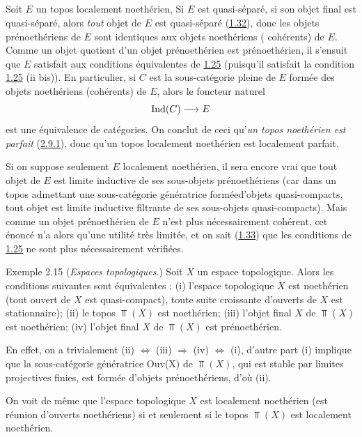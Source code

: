 \documentclass[10pt]{../fichiers-configuration-latex/smfart}
\begin{document}
\subsection{}
Soit $E$ un topos localement noethérien, Si $E$ est quasi-séparé,
\ie si son objet final est quasi-séparé, alors \emph{tout} objet de
$E$ est quasi-séparé (\hyperref[VI.subsec1.32]{1.32}), donc les objets
prénoethériens de $E$ sont identiques aux objets noethériens (\ie
cohérents) de $E$. Comme un objet quotient d'un objet prénoethérien
est prénoethérien, il s'ensuit que $E$ satisfait aux conditions
équivalentes de \hyperref[VI.cor1.25]{1.25} (puisqu'il satisfait la condition
\hyperref[VI.cor1.25]{1.25} (ii bis)). En particulier, si $C$ est la
sous-catégorie pleine de $E$ formée des objets noethériens
(cohérents) de $E$, alors le foncteur naturel
$$
\Ind(C) \to E
$$
est une équivalence de catégories. On conclut de ceci qu'\emph{un topos
noethérien est parfait} (\hyperref[VI.def2.9.1]{2.9.1}), donc qu'un topos localement
noethérien est localement parfait.

Si on suppose seulement $E$ localement noethérien, il sera encore
vrai que tout objet de $E$ est limite inductive de ses sous-objets
prénoethériens (car dans un topos admettant une sous-catégorie
génératrice formée\pageoriginale d'objets quasi-compacts, tout objet
est limite inductive filtrante de ses sous-objets quasi-compacts).
Mais comme un objet prénoethérien de $E$ n'est plus nécessairement
cohérent, cet énoncé n'a alors qu'une utilité très limitée, et on
sait (\hyperref[VI.exem1.33]{1.33}) que les conditions de \hyperref[VI.cor1.25]{1.25} ne
sont plus nécessairement vérifiées.

\begin{enonce*}[remark]{Exemple 2.15}
(\emph{Espaces topologiques}.) Soit $X$ un espace topologique. Alors
les conditions suivantes sont équivalentes : (i) l'espace
topologique $X$ est noethérien (\ie tout ouvert de $X$ est
quasi-compact), \ie toute suite croissante d'ouverts de $X$ est
stationnaire); (ii) le topos $\Top(X)$ est noethérien; (iii) l'objet
final $X$ de $\Top(X)$ est noethérien; (iv) l'objet final $X$ de
$\Top(X)$ est prénoethérien.

En effet, on a trivialement (ii) $\Leftrightarrow$ (iii) $\Rightarrow$
(iv) $\Leftrightarrow$ (i), d'autre part (i) implique que la
sous-catégorie génératrice Ouv(X) de $\Top(X)$, qui est stable par
limites projectives finies, est formée d'objets prénoethériens, d'où (ii).

On voit de même que l'espace topologique $X$ est localement
noethérien (\ie est réunion d'ouverts noethériens) si et seulement
si le topos $\Top(X)$ est localement noethérien.
\end{enonce*}
\end{document}

